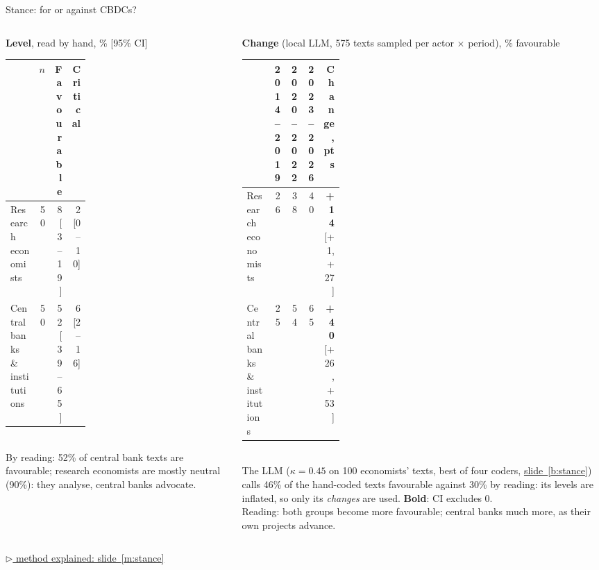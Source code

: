 \documentclass[aspectratio=169,10pt]{beamer}
\newcommand{\method}[1]{\hfill\hyperref[#1]{\tiny\textcolor{c4}{$\triangleright$ method explained: slide~\ref*{#1}}}}
\newcommand{\usedon}[1]{\hyperref[#1]{\textcolor{c4}{slide~\ref*{#1}}}}
\begin{document}
\begin{frame}{Stance: for or against CBDCs?}
\begin{columns}[T]
\begin{column}{0.44\textwidth}\scriptsize
\textbf{Level}, read by hand, \% [95\% CI]\\[2pt]
\setlength{\tabcolsep}{3pt}
\begin{tabular}{@{}p{0.36\linewidth}rrr@{}}\toprule
 & $n$ & \textbf{Favourable} & \textbf{Critical}\\\midrule
Research economists & 50 & 8 \tiny[3--19] & 2 \tiny[0--10] \\
Central banks \& institutions & 50 & 52 \tiny[39--65] & 6 \tiny[2--16] \\
\bottomrule\end{tabular}\\[6pt]
\small By reading: 52\% of central bank texts are favourable; research economists are mostly \alert{neutral} (90\%): they analyse, central banks advocate.
\end{column}
\begin{column}{0.54\textwidth}\scriptsize
\textbf{Change} (local LLM, 575 texts sampled per actor $\times$ period), \% favourable\\[2pt]
\setlength{\tabcolsep}{3pt}
\begin{tabular}{@{}p{0.27\linewidth}rrrr@{}}\toprule
 & \textbf{2014--2019} & \textbf{2020--2022} & \textbf{2023--2026} & \textbf{Change, pts}\\\midrule
Research economists & 26 & 38 & 40 & \textbf{+14} \tiny[+1, +27] \\
Central banks \& institutions & 25 & 54 & 65 & \textbf{+40} \tiny[+26, +53] \\
\bottomrule\end{tabular}\\[4pt]
The LLM ($\kappa = 0.45$ on 100 economists' texts, best of four coders, \usedon{b:stance}) calls 46\% of the hand-coded texts favourable against 30\% by reading: its levels are inflated, so only its \emph{changes} are used. \textbf{Bold}: CI excludes 0.\\[4pt]
\small \alert{Reading}: both groups become more favourable; central banks much more, as their own projects advance.
\end{column}
\end{columns}
\method{m:stance}
\end{frame}
\end{document}
